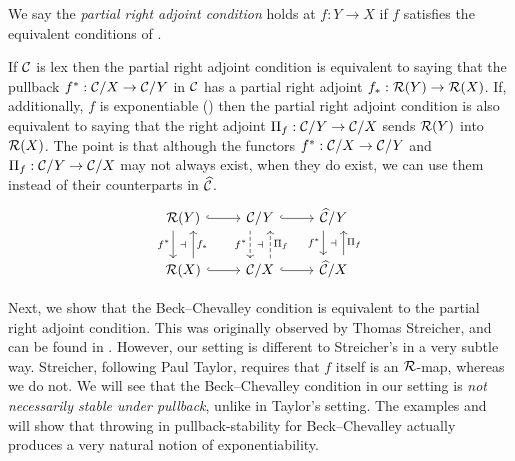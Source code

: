 \begin{definition} 
  We say the \emph{partial right adjoint condition}
  holds at $f : Y \to X$ if
  $f$ satisfies the equivalent conditions of
  .
\end{definition}

If $\mathcal{C}$ is lex then the partial right adjoint condition
is equivalent to saying that the pullback
$f^* : \mathcal{C} / X \to \mathcal{C} / Y$
in $\mathcal{C}$ has a partial right adjoint
$f_* : \mathcal{R}(Y) \to \mathcal{R}(X)$.
If, additionally, $f$ is exponentiable
()
then the partial right adjoint condition is also equivalent to saying that
the right adjoint $\Pi_f : \mathcal{C}/Y \to \mathcal{C}/X$ sends $\mathcal{R}(Y)$ into $\mathcal{R}(X)$.
The point is that although the functors
$f^* : \mathcal{C} / X \to \mathcal{C} / Y$ and $\Pi_f : \mathcal{C}/Y \to \mathcal{C}/X$
may not always exist,
when they do exist,
we can use them instead of their counterparts in $\widehat{\mathcal{C}}$.
\[
  \begin{tikzcd}
	{\RR(Y)} & {\CC / Y} & {\wCC / Y} \\
	{\RR(X)} & {\CC / X} & {\wCC / X}
	\arrow[hook, from=1-1, to=1-2]
	\arrow[""{name=0, anchor=center, inner sep=0}, "{f^*}"', shift right=3, from=1-1, to=2-1]
	\arrow[hook, from=1-2, to=1-3]
	\arrow[""{name=1, anchor=center, inner sep=0}, "{f^*}"', shift right=3, dashed, from=1-2, to=2-2]
	\arrow[""{name=2, anchor=center, inner sep=0}, "{f^*}"', shift right=3, from=1-3, to=2-3]
	\arrow[""{name=3, anchor=center, inner sep=0}, "{f_*}"', shift right=3, from=2-1, to=1-1]
	\arrow[hook, from=2-1, to=2-2]
	\arrow[""{name=4, anchor=center, inner sep=0}, "{\Pi_f}"', shift right=3, dashed, from=2-2, to=1-2]
	\arrow[hook, from=2-2, to=2-3]
	\arrow[""{name=5, anchor=center, inner sep=0}, "{\Pi_f}"', shift right=3, from=2-3, to=1-3]
	\arrow["\dashv"{anchor=center}, draw=none, from=0, to=3]
	\arrow["\dashv"{anchor=center}, draw=none, from=1, to=4]
	\arrow["\dashv"{anchor=center}, draw=none, from=2, to=5]
\end{tikzcd}\]

Next, we show that the Beck--Chevalley condition is equivalent
to the partial right adjoint condition.
This was originally observed by Thomas Streicher,
and can be found in \cite[Theorem 1.28]{streicher2012semantics}.
However,
our setting is different to Streicher's in a very subtle way.
Streicher, following Paul Taylor,
requires that $f$ itself is an $\mathcal{R}$-map, whereas we do not.
We will see that the Beck--Chevalley condition in our setting
is \emph{not necessarily stable under pullback},
unlike in Taylor's setting.
The examples and 
will show that throwing in pullback-stability for Beck--Chevalley
actually produces a very natural notion of exponentiability.

